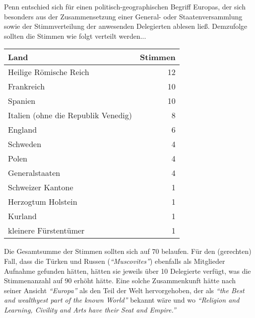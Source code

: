 \medskip

Penn entschied sich für einen politisch-geographischen Begriff Europas, der sich
besonders aus der Zusammensetzung einer General- oder Staatenversammlung sowie
der Stimmverteilung der anwesenden Delegierten ablesen ließ. Demzufolge sollten
die Stimmen wie folgt verteilt werden...

\begin{footnotesize}
\begin{center}
\begin{tabular}{|l|r|} \hline
\textbf{Land }                      & \textbf{Stimmen} \\ \hline \hline
Heilige Römische Reich              & 12               \\ \hline
Frankreich                          & 10               \\ \hline
Spanien                             & 10               \\ \hline
Italien (ohne die Republik Venedig) & 8                \\ \hline
England                             & 6                \\ \hline
Schweden                            & 4                \\ \hline
Polen                               & 4                \\ \hline
Generalstaaten                      & 4                \\ \hline
Schweizer Kantone                   & 1                \\ \hline
Herzogtum Holstein                  & 1                \\ \hline
Kurland                             & 1                \\ \hline
kleinere Fürstentümer               & 1                \\ \hline
\end{tabular}
\end{center}
\end{footnotesize}

 
  
  
  
 Die Gesamtsumme der Stimmen sollten sich auf 70 belaufen.
Für den (gerechten) Fall, dass die Türken und Russen (\textit{"`Muscovites"'})
ebenfalls als Mitglieder Aufnahme gefunden hätten, hätten sie jeweils über 10
Delegierte verfügt, was die Stimmenanzahl auf 90 erhöht hätte. Eine solche
Zusammenkunft hätte nach seiner Ansicht \textit{"`Europa"'} als den Teil der
Welt hervorgehoben, der als \textit{"`the Best and wealthyest part of the known
World"'} bekannt wäre und wo \textit{"`Religion and Learning, Civility and Arts
have
their Seat and Empire."'}

